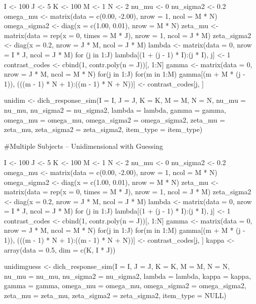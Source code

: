 \documentclass[a4paper]{book}
\begin{document}
\begin{Examples}
\begin{ExampleCode}
I <- 100
J <- 5
K <- 100
M <- 1
N <- 2
nu_mu <- 0
nu_sigma2 <- 0.2
omega_mu <- matrix(data = c(0.00, -2.00), nrow = 1, ncol = M * N)
omega_sigma2 <- diag(x = c(1.00, 0.01), nrow = M * N)
zeta_mu <- matrix(data = rep(x = 0, times = M * J), nrow = 1, ncol = J * M)
zeta_sigma2 <- diag(x = 0.2, nrow = J * M, ncol = J * M)
lambda <- matrix(data = 0, nrow = I * J, ncol = J * M)
for (j in 1:J) {
  lambda[(1 + (j - 1) * I):(j * I), j] <- 1
}
contrast_codes <- cbind(1, contr.poly(n = J))[, 1:N]
gamma <- matrix(data = 0, nrow = J * M, ncol = M * N)
for(j in 1:J) {
  for(m in 1:M) {
    gamma[(m + M * (j - 1)), (((m - 1) * N + 1):((m - 1) * N + N))] <-
    contrast_codes[j, ]
  }
}

unidim <- dich_response_sim(I = I, J = J, K = K, M = M, N = N, nu_mu = nu_mu,
                            nu_sigma2 = nu_sigma2, lambda = lambda,
                            gamma = gamma, omega_mu = omega_mu,
                            omega_sigma2 = omega_sigma2, zeta_mu = zeta_mu,
                            zeta_sigma2 = zeta_sigma2, item_type = item_type)


#Multiple Subjects -- Unidimensional with Guessing

I <- 100
J <- 5
K <- 100
M <- 1
N <- 2
nu_mu <- 0
nu_sigma2 <- 0.2
omega_mu <- matrix(data = c(0.00, -2.00), nrow = 1, ncol = M * N)
omega_sigma2 <- diag(x = c(1.00, 0.01), nrow = M * N)
zeta_mu <- matrix(data = rep(x = 0, times = M * J), nrow = 1, ncol = J * M)
zeta_sigma2 <- diag(x = 0.2, nrow = J * M, ncol = J * M)
lambda <- matrix(data = 0, nrow = I * J, ncol = J * M)
for (j in 1:J) {
  lambda[(1 + (j - 1) * I):(j * I), j] <- 1
}
contrast_codes <- cbind(1, contr.poly(n = J))[, 1:N]
gamma <- matrix(data = 0, nrow = J * M, ncol = M * N)
for(j in 1:J) {
  for(m in 1:M) {
    gamma[(m + M * (j - 1)), (((m - 1) * N + 1):((m - 1) * N + N))] <-
      contrast_codes[j, ]
  }
}
kappa <- array(data = 0.5, dim = c(K, I * J))

unidimguess <- dich_response_sim(I = I, J = J, K = K, M = M, N = N,
                                 nu_mu = nu_mu, nu_sigma2 = nu_sigma2,
                                 lambda = lambda, kappa = kappa,
                                 gamma = gamma, omega_mu = omega_mu,
                                 omega_sigma2 = omega_sigma2,
                                 zeta_mu = zeta_mu,
                                 zeta_sigma2 = zeta_sigma2, item_type = NULL)

\end{ExampleCode}
\end{Examples}
\end{document}
